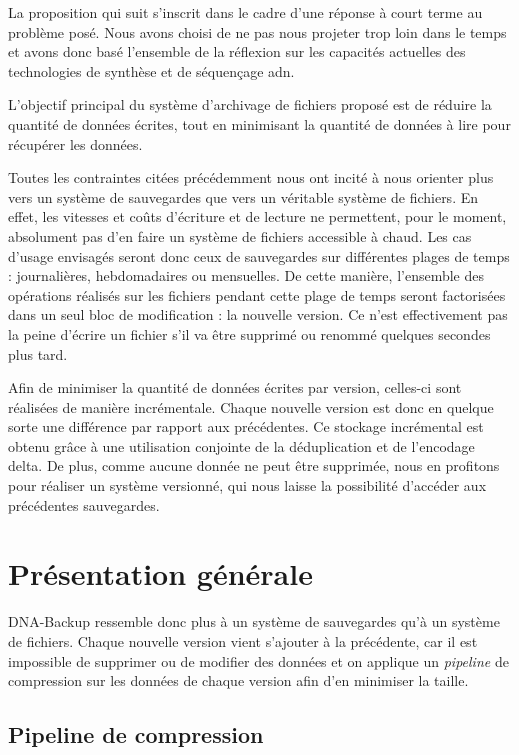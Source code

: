 \documentclass[a4paper]{report}
\begin{document}
La proposition qui suit s'inscrit dans le cadre d'une réponse à court terme au problème posé.
Nous avons choisi de ne pas nous projeter trop loin dans le temps et avons donc basé l'ensemble de la réflexion sur les capacités actuelles des technologies de synthèse et de séquençage \ac{adn}.

L'objectif principal du système d'archivage de fichiers proposé est de réduire la quantité de données écrites, tout en minimisant la quantité de données à lire pour récupérer les données.

Toutes les contraintes citées précédemment nous ont incité %
à nous orienter plus vers un système de sauvegardes que vers un véritable système de fichiers.
En effet, les vitesses et coûts d'écriture et de lecture ne permettent, pour le moment, absolument pas d'en faire un système de fichiers accessible à chaud.
Les cas d'usage envisagés seront donc ceux de sauvegardes sur différentes plages de temps : journalières, hebdomadaires ou mensuelles.
De cette manière, l'ensemble des opérations réalisés sur les fichiers pendant cette plage de temps seront factorisées dans un seul bloc de modification : la nouvelle version.
Ce n'est effectivement pas la peine d'écrire un fichier s'il va être supprimé ou renommé quelques secondes plus tard.

Afin de minimiser la quantité de données écrites par version, celles-ci sont réalisées de manière incrémentale.
Chaque nouvelle version est donc en quelque sorte une différence par rapport aux précédentes.
Ce stockage incrémental est obtenu grâce à une utilisation conjointe de la déduplication et de l'encodage delta.
De plus, comme aucune donnée ne peut être supprimée, nous en profitons pour réaliser un système versionné, qui nous laisse la possibilité d'accéder aux précédentes sauvegardes.


\chapter{Présentation générale}

DNA-Backup ressemble donc plus à un système de sauvegardes qu'à un système de fichiers.
Chaque nouvelle version vient s'ajouter à la précédente, car il est impossible de supprimer ou de modifier des données
et on applique un \emph{pipeline} de compression sur les données de chaque version afin d'en minimiser la taille.

\section{Pipeline de compression}
\end{document}
